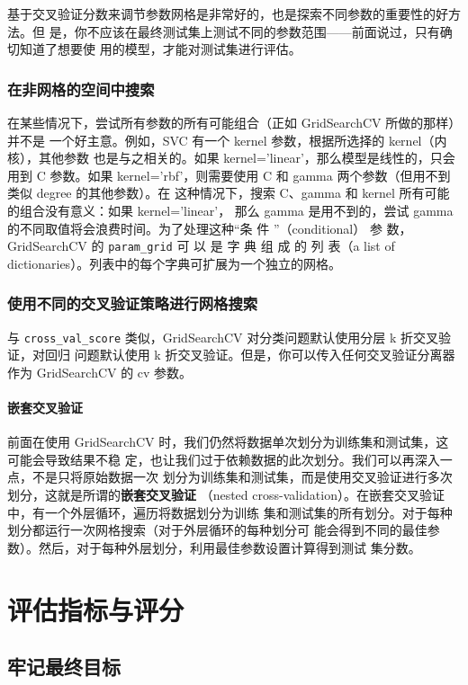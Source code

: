 基于交叉验证分数来调节参数网格是非常好的，也是探索不同参数的重要性的好方法。但
是，你不应该在最终测试集上测试不同的参数范围——前面说过，只有确切知道了想要使
用的模型，才能对测试集进行评估。
\subsubsection{在非网格的空间中搜索}
在某些情况下，尝试所有参数的所有可能组合（正如 GridSearchCV 所做的那样）并不是
一个好主意。例如，SVC 有一个 kernel 参数，根据所选择的 kernel（内核），其他参数
也是与之相关的。如果 kernel='linear'，那么模型是线性的，只会用到 C 参数。如果
kernel='rbf'，则需要使用 C 和 gamma 两个参数（但用不到类似 degree 的其他参数）。在
这种情况下，搜索 C、gamma 和 kernel 所有可能的组合没有意义：如果 kernel='linear'，
那么 gamma 是用不到的，尝试 gamma 的不同取值将会浪费时间。为了处理这种“条
件 ”（conditional） 参 数，GridSearchCV 的 \verb|param_grid| 可 以 是 字 典 组 成 的 列 表（a list of
dictionaries）。列表中的每个字典可扩展为一个独立的网格。
\subsubsection{使用不同的交叉验证策略进行网格搜索}
与 \verb|cross_val_score| 类似，GridSearchCV 对分类问题默认使用分层 k 折交叉验证，对回归
问题默认使用 k 折交叉验证。但是，你可以传入任何交叉验证分离器作为 GridSearchCV 的
cv 参数。

\paragraph{嵌套交叉验证} 前面在使用 GridSearchCV 时，我们仍然将数据单次划分为训练集和测试集，这可能会导致结果不稳
定，也让我们过于依赖数据的此次划分。我们可以再深入一点，不是只将原始数据一次
划分为训练集和测试集，而是使用交叉验证进行多次划分，这就是所谓的\textbf{嵌套交叉验证}
（nested cross-validation）。在嵌套交叉验证中，有一个外层循环，遍历将数据划分为训练
集和测试集的所有划分。对于每种划分都运行一次网格搜索（对于外层循环的每种划分可
能会得到不同的最佳参数）。然后，对于每种外层划分，利用最佳参数设置计算得到测试
集分数。
\section{评估指标与评分}
\subsection{牢记最终目标}
